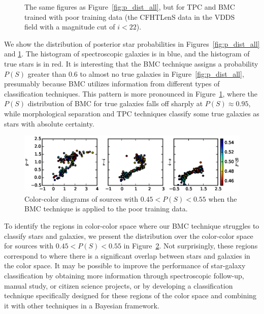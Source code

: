 \documentclass[useAMS,usenatbib]{mn2e}
\begin{document}
\begin{figure}
\begin{minipage}[t]{0.49\linewidth}
    \caption{The same figures as Figure~\ref{fig:p_dist_all},
             but for TPC and BMC trained with 
             poor training data
             (the CFHTLenS data in the VDDS field
             with a magnitude cut of $i<22$).}
    \label{fig:p_dist_cut}
  \end{minipage}
\end{figure}

We show the distribution of posterior star probabilities
in Figures~\ref{fig:p_dist_all} and \ref{fig:p_dist_cut}.
The histogram of spectroscopic galaxies is in blue,
and the histogram of true stars is in red.
It is interesting that the BMC technique assigns
a probability $P\left(S\right)$ greater than 0.6
to almost no true galaxies in Figure~\ref{fig:p_dist_all},
presumably because BMC utilizes information from
different types of classification techniques.
This pattern is more pronounced in Figure~\ref{fig:p_dist_cut},
where the $P\left(S\right)$ distribution of BMC for true galaxies
falls off sharply at $P\left(S\right)\approx0.95$,
while morphological separation and TPC techniques
classify some true galaxies as stars with absolute certainty.


\begin{figure}
  \centering
  \includegraphics[width=\linewidth]{figures/color_color.eps}
  \caption{Color-color diagrams of sources with
           $0.45<P\left(S\right)<0.55$ when the BMC technique
           is applied to the poor training data.}
  \label{fig:color_color}
\end{figure}

To identify the regions in color-color space
where our BMC technique struggles to classify stars and galaxies,
we present the distribution over the color-color space for sources with
$0.45 < P(S) < 0.55$ in Figure~\ref{fig:color_color}.
Not surprisingly, these regions correspond to
where there is a significant overlap between stars and galaxies
in the color space.
It may be possible to improve the performance of
star-galaxy classification by obtaining more information
through spectroscopic follow-up, manual study, or citizen science projects,
or by developing a classification technique specifically designed
for these regions of the color space and
combining it with other techniques in a Bayesian framework.
\end{document}
